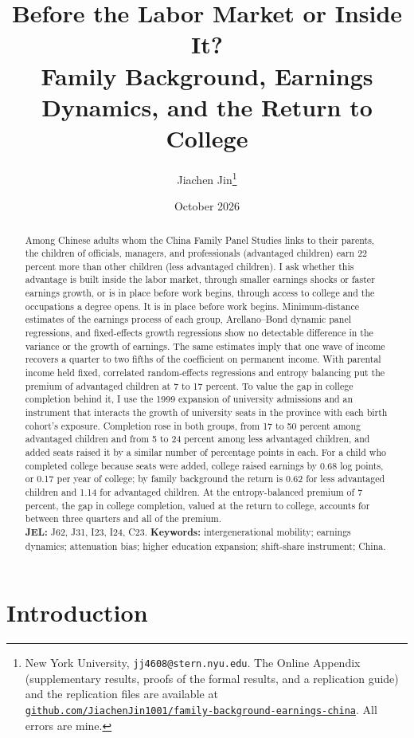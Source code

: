 \documentclass[11pt]{article}
\title{Before the Labor Market or Inside It?\\
Family Background, Earnings Dynamics, and the Return to College}
\author{Jiachen Jin\thanks{New York University, \texttt{jj4608@stern.nyu.edu}.
The Online Appendix (supplementary results, proofs of the formal results, and a replication guide) and the replication files are available at \href{\repourl}{\nolinkurl{github.com/JiachenJin1001/family-background-earnings-china}}.
All errors are mine.}}
\date{October 2026}
\begin{document}
\maketitle

\begin{abstract}
\noindent Among Chinese adults whom the China Family Panel Studies
links to their parents, the children of officials, managers, and
professionals (advantaged children) earn 22 percent more than other
children (less advantaged children). I ask whether this advantage is
built inside the labor market, through smaller earnings shocks or
faster earnings growth, or is in place before work begins, through access to college and the occupations a degree opens. It is in place before work begins.
Minimum-distance estimates of the earnings process of each group,
Arellano--Bond dynamic panel regressions, and fixed-effects growth
regressions show no detectable difference in the variance or the growth
of earnings. The same estimates imply that one wave of income recovers a quarter to two fifths of the coefficient
on permanent income. With parental income held fixed, correlated
random-effects regressions and entropy balancing put the premium of
advantaged children at 7 to 17 percent. To value the gap in college
completion behind it, I use the 1999 expansion of university admissions
and an instrument that interacts the growth of university seats in the
province with each birth cohort's exposure. Completion rose in both groups, from 17 to 50 percent among advantaged children and from 5 to 24 percent among less advantaged children, and added seats raised it by a similar number of percentage points in each. For a child who completed college because seats were added, college raised earnings by 0.68 log points, or 0.17 per year of college; by family background the return is 0.62 for less advantaged children and 1.14 for advantaged children. At the entropy-balanced premium of
7 percent, the gap in college completion, valued at the return to
college, accounts for between three quarters and all of the premium.\\[4pt]
\textbf{JEL:} J62, J31, I23, I24, C23. \quad \textbf{Keywords:}
intergenerational mobility; earnings dynamics;
attenuation bias; higher
education expansion; shift-share instrument; China.
\end{abstract}

\newpage

\section{Introduction}
\label{sec:intro}
\end{document}

